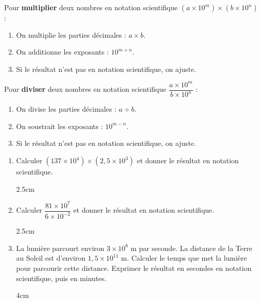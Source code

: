 \documentclass[a4paper]{book}
\begin{document}
    \begin{methode}
        Pour \textbf{multiplier} deux nombres en notation scientifique $(a \times 10^m) \times (b \times 10^n)$ :
        \begin{enumerate}
            \item On multiplie les parties décimales : $a \times b$.
            \item On additionne les exposants : $10^{m+n}$.
            \item Si le résultat n'est pas en notation scientifique, on ajuste.
        \end{enumerate}
        Pour \textbf{diviser} deux nombres en notation scientifique $\dfrac{a \times 10^m}{b \times 10^n}$ :
        \begin{enumerate}
            \item On divise les parties décimales : $a \div b$.
            \item On soustrait les exposants : $10^{m-n}$.
            \item Si le résultat n'est pas en notation scientifique, on ajuste.
        \end{enumerate}
    \end{methode}
 
    \begin{exemple}
        \begin{enumerate}
            \item Calculer $(137 \times 10^4) \times (2{,}5 \times 10^3)$ et donner le résultat en notation scientifique.
            \begin{ZoneReponse}{2.5cm}
            \end{ZoneReponse}

             \item Calculer $\dfrac{81 \times 10^7}{6 \times 10^{-2}}$ et donner le résultat en notation scientifique.
            \begin{ZoneReponse}{2.5cm}
            \end{ZoneReponse}
          
            \item La lumière parcourt environ $3 \times 10^8$ m par seconde. La distance de la Terre au Soleil est d'environ $1{,}5 \times 10^{11}$ m.
            Calculer le temps que met la lumière pour parcourir cette distance. Exprimer le résultat en secondes en notation scientifique, puis en minutes.
            \begin{ZoneReponse}{4cm}
            \end{ZoneReponse}
        \end{enumerate}
    \end{exemple}
 
\end{document}
